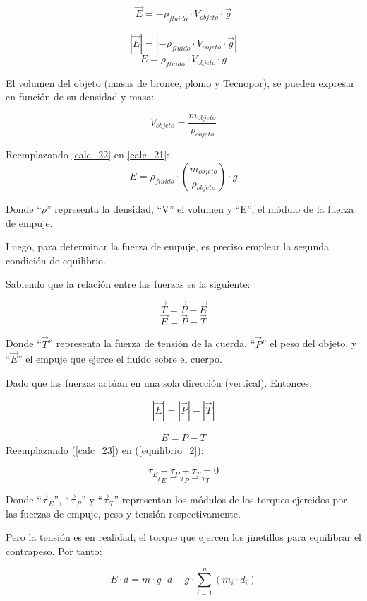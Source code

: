 \documentclass[../main.tex]{subfiles}
\begin{document}
\begin{align} 
    \Vec{E} = - \rho_{fluido} \cdot V_{objeto} \cdot \vec{g} \nonumber
\end{align}

\[ |\vec{E}|=|- \rho_{fluido}\cdot V_{objeto} \cdot \vec{g} | \]
\begin{equation} \label{calc_21} 
    E= \rho_{fluido}\cdot V_{objeto} \cdot g 
\end{equation}

El volumen del objeto (masas de bronce, plomo y Tecnopor), se pueden expresar en función de su densidad y masa:

\begin{equation} \label{calc_22}
    V_{objeto}=\frac{m_{objeto}}{\rho_{objeto}}
\end{equation} 

Reemplazando \ref{calc_22} en \ref{calc_21}:
\[E=\rho_{fluido}\cdot\left( \frac{m_{objeto}}{\rho_{objeto}} \right)\cdot g\]

Donde “$\rho$” representa la densidad, “V” el volumen y “E”, el módulo de la fuerza de empuje.

Luego, para determinar la fuerza de empuje, es preciso emplear la segunda condición de equilibrio.

Sabiendo que la relación entre las fuerzas es la siguiente:

\[\vec{T} = \vec{P} - \vec{E}\]
\[\vec{E} = \vec{P} - \vec{T}\]

Donde “$\vec{T}$” representa la fuerza de tensión de la cuerda, “$\vec{P}$” el peso del objeto,
y “$\vec{E}$” el empuje que ejerce el fluido sobre el cuerpo.

Dado que las fuerzas actúan en una sola dirección (vertical). Entonces:

\[|\vec{E}|=|\vec{P}|-|\vec{T}|\]

\begin{align} \label{calc_23}
    E=P-T
\end{align}
Reemplazando (\ref{calc_23}) en (\ref{equilibrio_2}):

\[\tau_E-\tau_P+\tau_T=0\]
\[\tau_E=\tau_P-\tau_T \]

Donde “$\vec{\tau}_E$”, “$\vec{\tau}_P$” y “$\vec{\tau}_T$” representan los módulos de los torques ejercidos 
por las fuerzas de empuje, peso y tensión respectivamente.

Pero la tensión es en realidad, el torque que ejercen los jinetillos para equilibrar el contrapeso. Por tanto:

\begin{equation} \label{calc_24}
    E\cdot d=m\cdot g\cdot d - g \cdot \sum_{i=1}^n (m_i\cdot d_i )
\end{equation}
\end{document}
